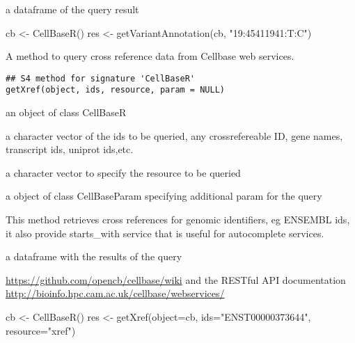 \documentclass[letterpaper]{book}
\begin{document}
%
\begin{Value}
a dataframe of the query result
\end{Value}
%
\begin{Examples}
\begin{ExampleCode}
cb <- CellBaseR()
res <- getVariantAnnotation(cb, "19:45411941:T:C")
\end{ExampleCode}
\end{Examples}
%
\begin{Description}\relax
A method to query cross reference data from Cellbase web services.
\end{Description}
%
\begin{Usage}
\begin{verbatim}
## S4 method for signature 'CellBaseR'
getXref(object, ids, resource, param = NULL)
\end{verbatim}
\end{Usage}
%
\begin{Arguments}
\begin{ldescription}
\item[\code{object}] an object of class CellBaseR

\item[\code{ids}] a character vector of the ids to be queried, any crossrefereable
ID, gene names, transcript ids, 
uniprot ids,etc.

\item[\code{resource}] a character vector to specify the resource to be queried

\item[\code{param}] a object of class CellBaseParam specifying additional param
for the query
\end{ldescription}
\end{Arguments}
%
\begin{Details}\relax
This method retrieves cross references for genomic identifiers, eg
ENSEMBL ids, it also provide starts\_with service that is useful for
autocomplete services.
\end{Details}
%
\begin{Value}
a dataframe with the results of the query
\end{Value}
%
\begin{SeeAlso}\relax
\url{https://github.com/opencb/cellbase/wiki} 
and the RESTful API documentation 
\url{http://bioinfo.hpc.cam.ac.uk/cellbase/webservices/}
\end{SeeAlso}
%
\begin{Examples}
\begin{ExampleCode}
   cb <- CellBaseR()
   res <- getXref(object=cb, ids="ENST00000373644", resource="xref")
\end{ExampleCode}
\end{Examples}
\printindex{}
\end{document}
